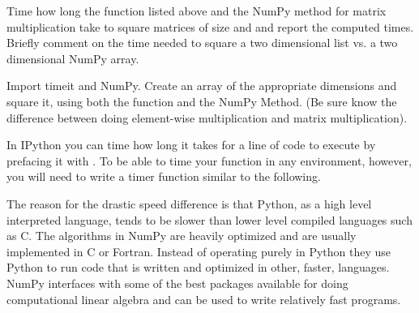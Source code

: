 \begin{problem} 
Time how long the  function 
listed above and the NumPy method for matrix multiplication take to square matrices of size 
and  and report the computed times. Briefly comment on the time needed to 
square a two dimensional list vs. a two dimensional NumPy array. 

Import timeit and NumPy. Create an array of the appropriate dimensions and square it, 
using both the function and the NumPy Method. (Be sure know the difference
 between doing element-wise multiplication and matrix multiplication).

In IPython you can time how long it takes for a line of code to execute
by prefacing it with . To be able to time your function in any environment, however, 
you will need to write a timer function similar to the following.


\end{problem}

% 
% 
% 
The reason for the drastic speed difference is that Python, as a high
level interpreted language, tends to be slower than lower level compiled
languages such as C. The algorithms in NumPy are heavily optimized and
are usually implemented in C or Fortran. Instead of operating purely in
Python they use Python to run code that is written and optimized in
other, faster, languages. NumPy interfaces with some of the best packages
available for doing computational linear algebra and can be used to
write relatively fast programs.


